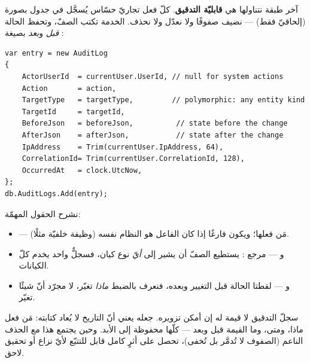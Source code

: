 آخر طبقة نتناولها هي \textbf{قابليّة التدقيق}. كلّ فعل تجاريّ حسّاس يُسجَّل في جدول
 بصورة  (إلحاقيّ فقط) — نضيف صفوفًا ولا نعدّل ولا نحذف.
الخدمة  تكتب الصفّ، وتحفظ الحالة \emph{قبل} و\emph{بعد} بصيغة
:

\begin{english}
\begin{lstlisting}[language={[Sharp]C}]
var entry = new AuditLog
{
    ActorUserId  = currentUser.UserId, // null for system actions
    Action       = action,
    TargetType   = targetType,         // polymorphic: any entity kind
    TargetId     = targetId,
    BeforeJson   = beforeJson,          // state before the change
    AfterJson    = afterJson,           // state after the change
    IpAddress    = Trim(currentUser.IpAddress, 64),
    CorrelationId= Trim(currentUser.CorrelationId, 128),
    OccurredAt   = clock.UtcNow,
};
db.AuditLogs.Add(entry);
\end{lstlisting}
\end{english}

نشرح الحقول المهمّة:
\begin{itemize}
\item {} — مَن فعلها؛ ويكون فارغًا  إذا كان الفاعل هو
  النظام نفسه (وظيفة خلفيّة مثلًا).
\item {} و — مرجع : يستطيع الصفّ أن
  يشير إلى \emph{أيّ} نوع كيان، فسجلٌّ واحد يخدم كلّ الكيانات.
\item {} و — لقطتا الحالة قبل التغيير وبعده، فنعرف
  بالضبط \emph{ماذا} تغيّر، لا مجرّد أنّ شيئًا تغيّر.
\end{itemize}

\begin{keyp}
سجلّ التدقيق لا قيمة له إن أمكن تزويره. جعله  يعني أنّ التاريخ لا
يُعاد كتابته: مَن فعل ماذا، ومتى، وما القيمة قبل وبعد — كلّها محفوظة إلى الأبد. وحين
يجتمع هذا مع الحذف الناعم (الصفوف لا تُدمَّر بل تُخفى)، تحصل على أثرٍ كامل قابل
للتتبّع لأيّ نزاع أو تحقيق لاحق.
\end{keyp}

